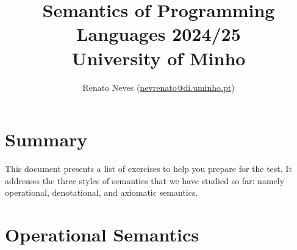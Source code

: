 \documentclass[a4paper, 11pt]{article}
\date{}
\theoremstyle{definition}
\begin{document}
\allowdisplaybreaks[2]
\title{\large{Semantics of Programming Languages 2024/25}
        \\ \large{University of Minho} 
}

\author{\small{Renato Neves} \small
(\href{mailto:nevrenato@di.uminho.pt}{nevrenato@di.uminho.pt})}
\maketitle

\section{Summary}

This document presents a list of exercises to help you prepare for the test.
It addresses the three styles of semantics that we have studied so far: namely
operational, denotational, and axiomatic semantics.

\section{Operational Semantics}
\end{document}
